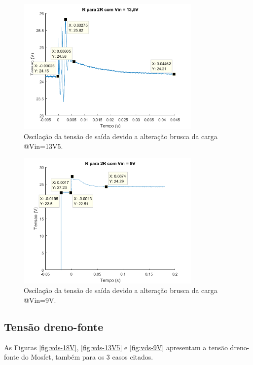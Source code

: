 \documentclass[a4paper]{article}
\begin{document}
{\begin{figure}[H]
	\centering
	\includegraphics[width=0.8\textwidth]{R-para-2R-13V5.png}
	\caption{Oscilação da tensão de saída devido a alteração brusca da carga @Vin=13V5.}
	\label{fig:trans-R-2R-13V5}
\end{figure}

\begin{figure}[H]
	\centering
	\includegraphics[width=0.8\textwidth]{R-para-2R-9V.png}
	\caption{Oscilação da tensão de saída devido a alteração brusca da carga @Vin=9V.}
	\label{fig:trans-R-2R-9V}
\end{figure}

\subsection{Tensão dreno-fonte}
\label{subsub:vds}

As Figuras \ref{fig:vds-18V}, \ref{fig:vds-13V5} e \ref{fig:vds-9V} apresentam a tensão dreno-fonte do Mosfet, também para os 3 casos citados.

}
\end{document}
